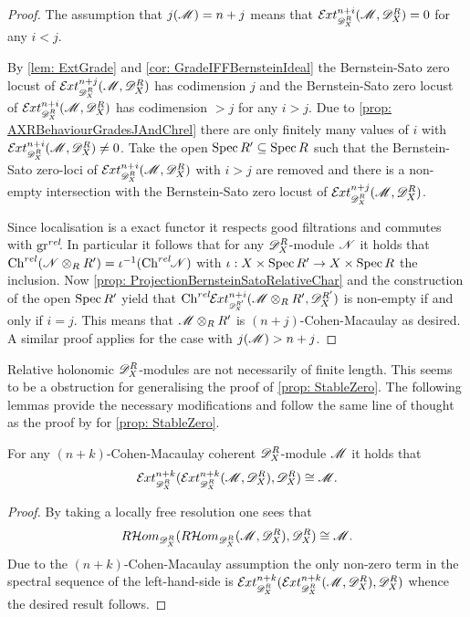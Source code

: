 \begin{proof}
  The assumption that $j(\mathscr{M}) = n+j$ means that $\Ex{\D_X^R}{n+i}(\M,\D_X^R) = 0$ for any $i<j$.

  By \cref{lem: ExtGrade} and \cref{cor: GradeIFFBernsteinIdeal} the Bernstein-Sato zero locust of  $\Ex{\D_X^R}{n+j}(\M,\D_X^R)$ has codimension $j$ and the Bernstein-Sato zero locust of $\Ex{\D_X^R}{n+i}(\M,\D_X^R)$ has codimension $>j$ for any $i>j$.
  Due to \cref{prop: AXRBehaviourGradesJAndChrel} there are only finitely many values of $i$ with $\Ex{\D_X^R}{n+i}(\M,\D_X^R) \neq 0$.
  Take the open $\operatorname{Spec} R' \subseteq \operatorname{Spec} R$ such that the Bernstein-Sato zero-loci of $\Ex{\D_X^R}{n+i}(\M,\D_X^R)$ with $i>j$ are removed and there is a non-empty intersection with the Bernstein-Sato zero locust of $\Ex{\D_X^R}{n+j}(\M,\D_X^R)$.

  Since localisation is a exact functor it respects good filtrations and commutes with $\operatorname{gr}^{rel}\mkern-5mu$.
  In particular it follows that for any $\mathscr{D}_X^R$-module $\mathscr{N}$ it holds that $\operatorname{Ch}^{rel}(\mathscr{N}\otimes_R R')= \iota^{-1}(\operatorname{Ch}^{rel}\mkern-5mu\mathscr{N})$ with $\iota:X\times \operatorname{Spec} R' \to X\times\operatorname{Spec} R$ the inclusion.
  Now \cref{prop: ProjectionBernsteinSatoRelativeChar} and the construction of the open $\operatorname{Spec} R'$ yield that $\Chrel\Ex{\D_X^{R'}}{n+i}(\M\otimes_R R',\D_X^{R'})$ is non-empty if and only if $i=j$.
  This means that $\mathscr{M}\otimes_R R'$ is $(n+j)$-Cohen-Macaulay as desired.
  A similar proof applies for the case with $j(\mathscr{M})>n+j$.
\end{proof}
Relative holonomic $\mathscr{D}_X^R$-modules are not necessarily of finite length.
This seems to be a obstruction for generalising the proof of \cref{prop: StableZero}.
The following lemmas provide the necessary modifications and follow the same line of thought as the proof by \cite{kashiwara1976b} for \cref{prop: StableZero}.
\begin{lemma}
  For any $(n+k)$-Cohen-Macaulay coherent $\mathscr{D}_X^R$-module $\mathscr{M}$ it holds that  $$\Ex{\D_X^R}{n+k}(\Ex{\D_X^R}{n+k}(\M,\D_X^R),\D_X^R) \cong \M.$$
\end{lemma}
\begin{proof}
  By taking a locally free resolution one sees that
  $$R\mathcal{H}om_{\mathscr{D}_X^R}(R\mathcal{H}om_{\mathscr{D}_X^R}(\mathscr{M}, \mathscr{D}_X^R),\mathscr{D}_X^R) \cong \mathscr{M}.$$
  Due to the $(n+k)$-Cohen-Macaulay assumption the only non-zero term in the spectral sequence of the left-hand-side is $\Ex{\D_X^R}{n+k}(\Ex{\D_X^R}{n+k}(\M,\D_X^R),\D_X^R)$ whence the desired result follows.
\end{proof}

